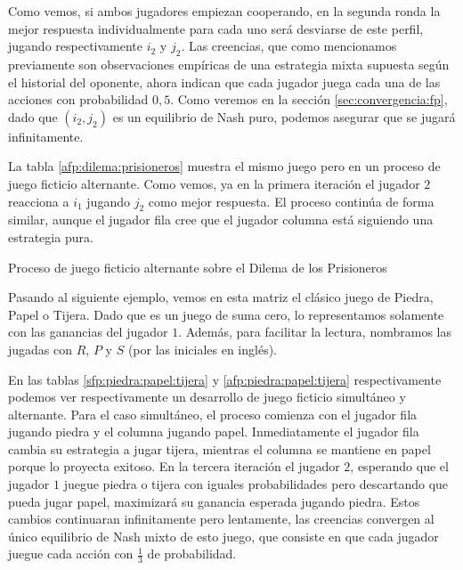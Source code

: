 Como vemos, si ambos jugadores empiezan cooperando, en la segunda ronda la mejor respuesta individualmente para cada uno será desviarse de este perfil, jugando respectivamente $i_2$ y $j_2$. Las creencias, que como mencionamos previamente son observaciones empíricas de una estrategia mixta supuesta según el historial del oponente, ahora indican que cada jugador juega cada una de las acciones con probabilidad $0,5$. Como veremos en la sección \ref{sec:convergencia:fp}, dado que $(i_2, j_2)$ es un equilibrio de Nash puro, podemos asegurar que se jugará infinitamente.

La tabla \ref{afp:dilema:prisioneros} muestra el mismo juego pero en un proceso de juego ficticio alternante. Como vemos, ya en la primera iteración el jugador $2$ reacciona a $i_1$ jugando $j_2$ como mejor respuesta. El proceso continúa de forma similar, aunque el jugador fila cree que el jugador columna está siguiendo una estrategia pura.

\begin{table} %
    \centering
    
    \caption{Proceso de juego ficticio alternante sobre el Dilema de los Prisioneros}
    \label{afp:dilema:prisioneros}
\end{table}

Pasando al siguiente ejemplo, vemos en esta matriz el clásico juego de Piedra, Papel o Tijera. Dado que es un juego de suma cero, lo representamos solamente con las ganancias del jugador $1$. Además, para facilitar la lectura, nombramos las jugadas con $R$, $P$ y $S$ (por las iniciales en inglés).



En las tablas \ref{sfp:piedra:papel:tijera} y \ref{afp:piedra:papel:tijera} respectivamente podemos ver respectivamente un desarrollo de juego ficticio simultáneo y alternante. Para el caso simultáneo, el proceso comienza con el jugador fila jugando piedra y el columna jugando papel. Inmediatamente el jugador fila cambia su estrategia a jugar tijera, mientras el columna se mantiene en papel porque lo proyecta exitoso. En la tercera iteración el jugador $2$, esperando que el jugador $1$ juegue piedra o tijera con iguales probabilidades pero descartando que pueda jugar papel, maximizará su ganancia esperada jugando piedra. Estos cambios continuaran infinitamente pero lentamente, las creencias convergen al único equilibrio de Nash mixto de esto juego, que consiste en que cada jugador juegue cada acción con $\frac{1}{3}$ de probabilidad. 

